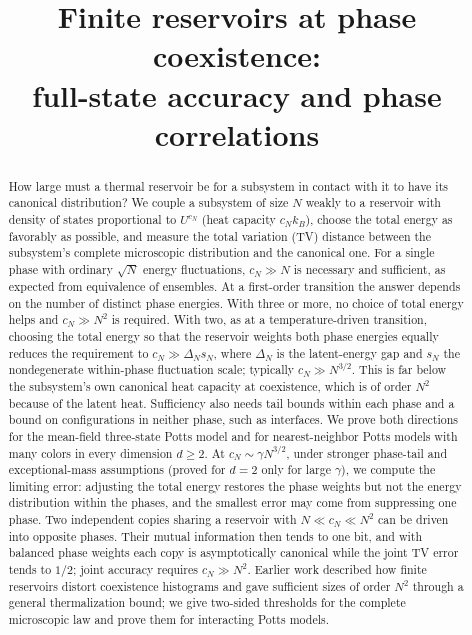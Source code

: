 \documentclass[11pt]{article}
\title{Finite reservoirs at phase coexistence:\\ full-state accuracy and phase correlations}
\author{}
\date{}
\numberwithin{equation}{section}
\theoremstyle{definition}
\theoremstyle{remark}
\begin{document}
\maketitle
\begin{abstract}
How large must a thermal reservoir be for a subsystem in contact with
it to have its canonical distribution? We couple a subsystem of size
$N$ weakly to a reservoir with density of states proportional to
$U^{c_N}$ (heat capacity $c_Nk_B$), choose the total energy as
favorably as possible, and measure the total variation (TV) distance
between the subsystem's complete microscopic distribution and the
canonical one. For a single phase with
ordinary $\sqrt N$ energy fluctuations, $c_N\gg N$ is necessary and
sufficient, as expected from equivalence of ensembles. At a first-order
transition the answer depends on the number of distinct phase energies.
With three or more, no choice of total energy helps and $c_N\gg N^2$
is required. With two, as at a temperature-driven transition,
choosing the total energy so that the reservoir weights both
phase energies equally reduces the requirement to $c_N\gg\Delta_Ns_N$,
where $\Delta_N$ is the latent-energy gap and $s_N$ the nondegenerate
within-phase fluctuation scale; typically $c_N\gg N^{3/2}$. This is far
below the subsystem's own canonical heat capacity at coexistence, which
is of order $N^2$ because of the latent heat. Sufficiency also needs tail
bounds within each phase and a bound on configurations in neither
phase, such as interfaces. We prove both
directions for the mean-field three-state Potts model and for
nearest-neighbor Potts models with many colors in every dimension
$d\ge2$. At $c_N\sim\gamma N^{3/2}$, under stronger phase-tail and
exceptional-mass assumptions (proved for $d=2$ only for large
$\gamma$), we compute the limiting error: adjusting the total energy
restores the phase weights but not the energy distribution within the
phases, and the smallest error may come from suppressing one phase. Two
independent copies sharing a reservoir with $N\ll c_N\ll N^2$ can be
driven into opposite phases. Their mutual information then tends to
one bit, and with balanced phase weights each copy is asymptotically
canonical while the joint TV error tends to $1/2$; joint accuracy
requires $c_N\gg N^2$. Earlier work described how finite reservoirs
distort coexistence histograms and gave sufficient sizes of order
$N^2$ through a general thermalization bound; we give two-sided
thresholds for the complete microscopic law and prove them for
interacting Potts models.
\end{abstract}
\tableofcontents








\clearpage
\appendix





\begingroup
\raggedright

\endgroup
\end{document}
